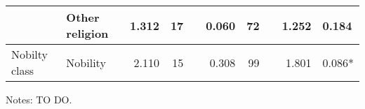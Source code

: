 \begin{table}[h!]
{\begin{threeparttable}
\begin{tabular}{llrrlrrlrl}
	& Other religion                                                       & 1.312                        & 17                    &  & 0.060                        & 72                    &  & 1.252                                           & 0.184                                                                                               \\ \hline
	Nobilty class                                                                      & Nobility                                                             & 2.110                        & 15                    &  & 0.308                        & 99                    &  & 1.801                                           & 0.086*                                                                                              \\ \hline \hline
\end{tabular}
\begin{tablenotes}
	\footnotesize{Notes: TO DO.}
\end{tablenotes}
\end{threeparttable}
}
\end{table}